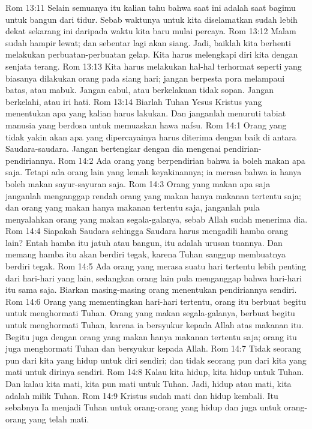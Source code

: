 Rom 13:11  Selain semuanya itu kalian tahu bahwa saat ini adalah saat bagimu untuk bangun dari tidur. Sebab waktunya untuk kita diselamatkan sudah lebih dekat sekarang ini daripada waktu kita baru mulai percaya.
Rom 13:12  Malam sudah hampir lewat; dan sebentar lagi akan siang. Jadi, baiklah kita berhenti melakukan perbuatan-perbuatan gelap. Kita harus melengkapi diri kita dengan senjata terang.
Rom 13:13  Kita harus melakukan hal-hal terhormat seperti yang biasanya dilakukan orang pada siang hari; jangan berpesta pora melampaui batas, atau mabuk. Jangan cabul, atau berkelakuan tidak sopan. Jangan berkelahi, atau iri hati.
Rom 13:14  Biarlah Tuhan Yesus Kristus yang menentukan apa yang kalian harus lakukan. Dan janganlah menuruti tabiat manusia yang berdosa untuk memuaskan hawa nafsu.
Rom 14:1  Orang yang tidak yakin akan apa yang dipercayainya harus diterima dengan baik di antara Saudara-saudara. Jangan bertengkar dengan dia mengenai pendirian-pendiriannya.
Rom 14:2  Ada orang yang berpendirian bahwa ia boleh makan apa saja. Tetapi ada orang lain yang lemah keyakinannya; ia merasa bahwa ia hanya boleh makan sayur-sayuran saja.
Rom 14:3  Orang yang makan apa saja janganlah menganggap rendah orang yang makan hanya makanan tertentu saja; dan orang yang makan hanya makanan tertentu saja, janganlah pula menyalahkan orang yang makan segala-galanya, sebab Allah sudah menerima dia.
Rom 14:4  Siapakah Saudara sehingga Saudara harus mengadili hamba orang lain? Entah hamba itu jatuh atau bangun, itu adalah urusan tuannya. Dan memang hamba itu akan berdiri tegak, karena Tuhan sanggup membuatnya berdiri tegak.
Rom 14:5  Ada orang yang merasa suatu hari tertentu lebih penting dari hari-hari yang lain, sedangkan orang lain pula menganggap bahwa hari-hari itu sama saja. Biarkan masing-masing orang menentukan pendiriannya sendiri.
Rom 14:6  Orang yang mementingkan hari-hari tertentu, orang itu berbuat begitu untuk menghormati Tuhan. Orang yang makan segala-galanya, berbuat begitu untuk menghormati Tuhan, karena ia bersyukur kepada Allah atas makanan itu. Begitu juga dengan orang yang makan hanya makanan tertentu saja; orang itu juga menghormati Tuhan dan bersyukur kepada Allah.
Rom 14:7  Tidak seorang pun dari kita yang hidup untuk diri sendiri; dan tidak seorang pun dari kita yang mati untuk dirinya sendiri.
Rom 14:8  Kalau kita hidup, kita hidup untuk Tuhan. Dan kalau kita mati, kita pun mati untuk Tuhan. Jadi, hidup atau mati, kita adalah milik Tuhan.
Rom 14:9  Kristus sudah mati dan hidup kembali. Itu sebabnya Ia menjadi Tuhan untuk orang-orang yang hidup dan juga untuk orang-orang yang telah mati.
